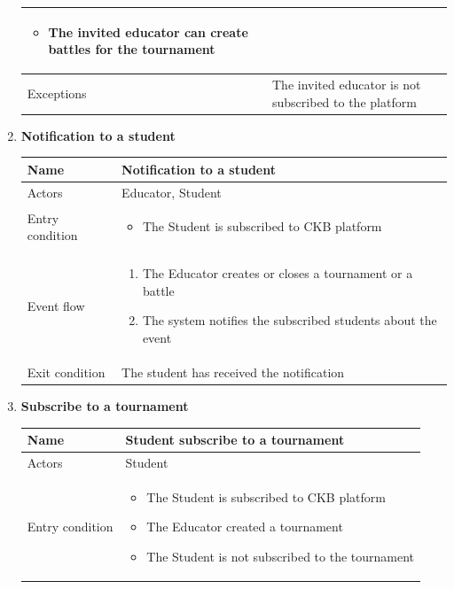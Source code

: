 \begin{enumerate}[label=UC\arabic*:]
\begin{tabular}{|p{3cm}|p{8cm}|}
\begin{itemize}
            \item The invited educator can create battles for the tournament
        \end{itemize} \\
        \hline
        Exceptions & The invited educator is not subscribed to the platform \\
        \hline
    \end{tabular}
    \item \textbf{Notification to a student} \\
    \begin{tabular}{|p{3cm}|p{8cm}|}
        \hline
        Name & Notification to a student \\
        \hline
        Actors & Educator, Student \\
        \hline
        Entry condition &
        \begin{itemize}
            \item The Student is subscribed to CKB platform
        \end{itemize}
        \\
        \hline
        Event flow &
        \begin{enumerate}[label=\arabic*.]
            \item The Educator creates or closes a tournament or a battle
            \item The system notifies the subscribed students about the event
        \end{enumerate}
        \\
        \hline
        Exit condition & The student has received the notification   \\
        \hline
    \end{tabular}
    \item \textbf{Subscribe to a tournament} \\
    \begin{tabular}{|p{3cm}|p{8cm}|}
        \hline
        Name & Student subscribe to a tournament \\
        \hline
        Actors & Student \\
        \hline
        Entry condition &
        \begin{itemize}
            \item The Student is subscribed to CKB platform
            \item The Educator created a tournament
            \item The Student is not subscribed to the tournament

\end{itemize}
\end{tabular}
\end{enumerate}
